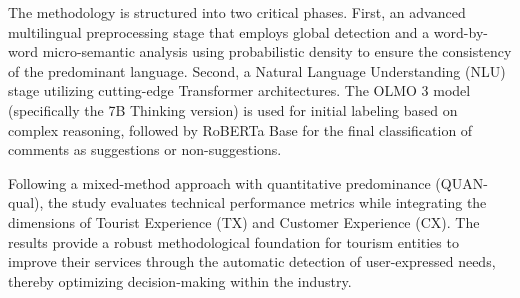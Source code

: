 The methodology is structured into two critical phases. First, an advanced multilingual preprocessing stage that employs global detection and a word-by-word micro-semantic analysis using probabilistic density to ensure the consistency of the predominant language. Second, a Natural Language Understanding (NLU) stage utilizing cutting-edge Transformer architectures. The OLMO 3 model (specifically the 7B Thinking version) is used for initial labeling based on complex reasoning, followed by RoBERTa Base for the final classification of comments as suggestions or non-suggestions.

Following a mixed-method approach with quantitative predominance (QUAN-qual), the study evaluates technical performance metrics while integrating the dimensions of Tourist Experience (TX) and Customer Experience (CX). The results provide a robust methodological foundation for tourism entities to improve their services through the automatic detection of user-expressed needs, thereby optimizing decision-making within the industry.



